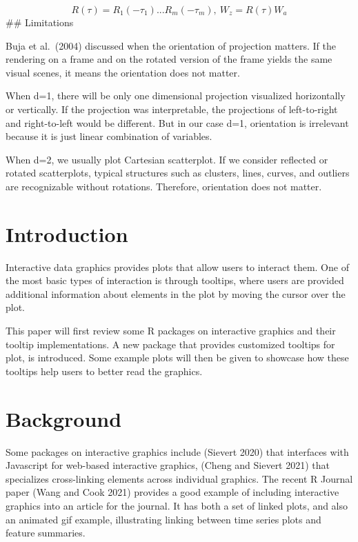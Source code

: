 \[R(\tau) = R_1(-\tau_1) ... R_m(-\tau_m), \    W_z = R(\tau)W_a\]
\#\# Limitations

Buja et al.~(2004) discussed when the orientation of projection matters. If the rendering on a frame and on the rotated version of the frame yields the same visual scenes, it means the orientation does not matter.

When d=1, there will be only one dimensional projection visualized horizontally or vertically. If the projection was interpretable, the projections of left-to-right and right-to-left would be different. But in our case d=1, orientation is irrelevant because it is just linear combination of variables.

When d=2, we usually plot Cartesian scatterplot. If we consider reflected or rotated scatterplots, typical structures such as clusters, lines, curves, and outliers are recognizable without rotations. Therefore, orientation does not matter.

\hypertarget{introduction-1}{%
\section{Introduction}\label{introduction-1}}

Interactive data graphics provides plots that allow users to interact them. One of the most basic types of interaction is through tooltips, where users are provided additional information about elements in the plot by moving the cursor over the plot.

This paper will first review some R packages on interactive graphics and their tooltip implementations. A new package  that provides customized tooltips for plot, is introduced. Some example plots will then be given to showcase how these tooltips help users to better read the graphics.

\hypertarget{background-1}{%
\section{Background}\label{background-1}}

Some packages on interactive graphics include  (Sievert 2020) that interfaces with Javascript for web-based interactive graphics,  (Cheng and Sievert 2021) that specializes cross-linking elements across individual graphics. The recent R Journal paper  (Wang and Cook 2021) provides a good example of including interactive graphics into an article for the journal. It has both a set of linked plots, and also an animated gif example, illustrating linking between time series plots and feature summaries.

